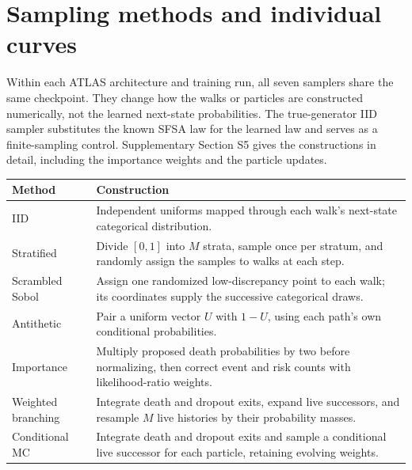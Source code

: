 \section{Sampling methods and individual curves}\label{app:samplers}
Within each ATLAS architecture and training run, all seven samplers share the same checkpoint. They change how the walks or particles are constructed numerically, not the learned next-state probabilities. The true-generator IID sampler substitutes the known SFSA law for the learned law and serves as a finite-sampling control. Supplementary Section S5 gives the constructions in detail, including the importance weights and the particle updates.

\begin{center}\begin{minipage}{\textwidth}\centering\small
\begin{tabular}{p{}p{}}\toprule
Method & Construction\\\midrule
IID & Independent uniforms mapped through each walk's next-state categorical distribution.\\
Stratified & Divide $[0,1]$ into $M$ strata, sample once per stratum, and randomly assign the samples to walks at each step.\\
Scrambled Sobol & Assign one randomized low-discrepancy point to each walk; its coordinates supply the successive categorical draws.\\
Antithetic & Pair a uniform vector $U$ with $1-U$, using each path's own conditional probabilities.\\
Importance & Multiply proposed death probabilities by two before normalizing, then correct event and risk counts with likelihood-ratio weights.\\
Weighted branching & Integrate death and dropout exits, expand live successors, and resample $M$ live histories by their probability masses.\\
Conditional MC & Integrate death and dropout exits and sample a conditional live successor for each particle, retaining evolving weights.\\\bottomrule
\end{tabular}
\end{minipage}\end{center}

